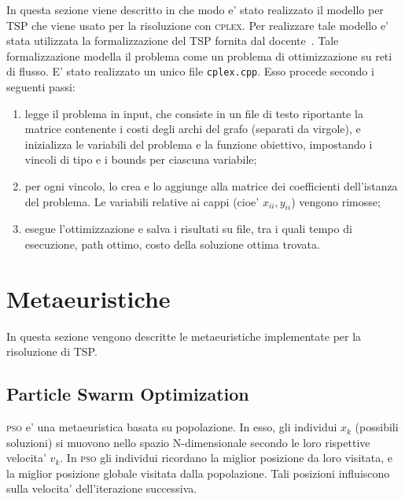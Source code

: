 \documentclass[
12pt, %
a4paper, %
oneside, %
headinclude,footinclude, %
BCOR5mm, %
]{scrartcl}
\begin{document}
In questa sezione viene descritto in che modo e' stato realizzato il modello per TSP che viene usato per la risoluzione con \textsc{cplex}. Per realizzare tale modello e' stata utilizzata la formalizzazione del TSP fornita dal docente~\cite{luigitraccia1}. Tale formalizzazione modella il problema come un problema di ottimizzazione su reti di flusso. E' stato realizzato un unico file \texttt{cplex.cpp}. Esso procede secondo i seguenti passi:
\begin{enumerate}
 \item legge il problema in input, che consiste in un file di testo riportante la matrice contenente i costi degli archi del grafo (separati da virgole), e inizializza le variabili del problema e la funzione obiettivo, impostando i vincoli di tipo e i bounds per ciascuna variabile;
 \item per ogni vincolo, lo crea e lo aggiunge alla matrice dei coefficienti dell'istanza del problema. Le variabili relative ai cappi (cioe' $x_{ii}, y_{ii}$) vengono rimosse;
 \item esegue l'ottimizzazione e salva i risultati su file, tra i quali tempo di esecuzione, path ottimo, costo della soluzione ottima trovata.
\end{enumerate}


\section{Metaeuristiche} \label{sec:eur}
In questa sezione vengono descritte le metaeuristiche implementate per la risoluzione di TSP. 

\subsection{Particle Swarm Optimization}

\textsc{pso} e' una metaeuristica basata su popolazione. In esso, gli individui $x_k$ (possibili soluzioni) si muovono nello spazio N-dimensionale secondo le loro rispettive velocita' $v_k$. In \textsc{pso} gli individui ricordano la miglior posizione da loro visitata, e la miglior posizione globale visitata dalla popolazione. Tali posizioni influiscono sulla velocita' dell'iterazione successiva. 
\end{document}

